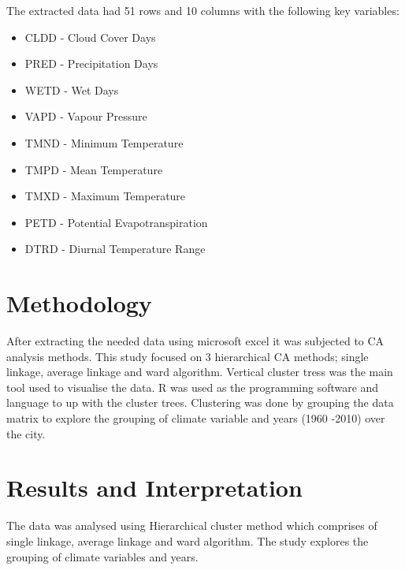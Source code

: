 \documentclass[12pt,a4paper]{article}
\begin{document}
\noindent The extracted data had 51 rows and 10 columns with the following key variables:
\begin{itemize}
	\item CLDD - Cloud Cover Days
	\item PRED - Precipitation Days
	\item WETD - Wet Days
	\item  VAPD - Vapour Pressure
	\item TMND - Minimum Temperature
	\item TMPD - Mean Temperature
	\item TMXD - Maximum Temperature
	\item PETD - Potential Evapotranspiration
	\item DTRD - Diurnal Temperature Range
\end{itemize}

 
\section{Methodology} 
 After extracting the needed data using microsoft excel it was subjected to CA analysis methods. This study focused on 3 hierarchical CA methods; single linkage, average linkage and ward algorithm. Vertical cluster tress was the main tool used to visualise the data. R was used as the programming software and language to up with the cluster trees. Clustering was done by grouping the data matrix to explore the grouping of climate variable and years (1960 -2010) over the city.
\section{Results and Interpretation}
The data was analysed using Hierarchical cluster method which comprises of single linkage, average linkage and ward algorithm. The study explores the grouping of climate variables and years.
\end{document}
